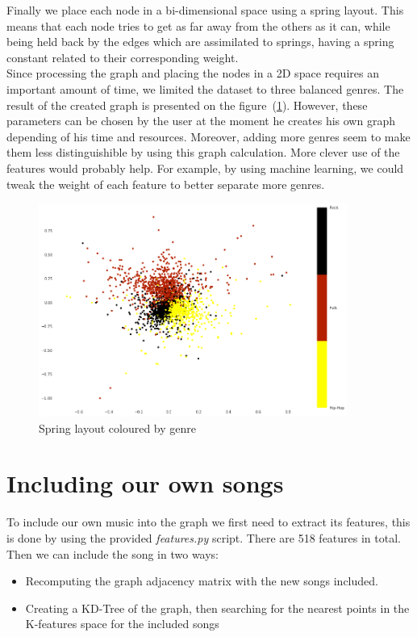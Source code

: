 \documentclass[11pt,a4paper,twoside]{article}
\begin{document}
Finally we place each node in a bi-dimensional space using a spring layout. This means that each node tries to get as far away from the others as it can, while being held back by the edges which are assimilated to springs, having a spring constant related to their corresponding weight.\\

Since processing the graph and placing the nodes in a 2D space requires an important amount of time, we limited the dataset to three balanced genres. The result of the created graph is presented on the figure~(\ref{fig:spring_layout}). However, these parameters can be chosen by the user at the moment he creates his own graph depending of his time and resources. Moreover, adding more genres seem to make them less distinguishible by using this graph calculation. More clever use of the features would probably help. For example, by using machine learning, we could tweak the weight of each feature to better separate more genres.

\begin{figure}[H]
\centering
\includegraphics[width=0.9\textwidth] {./Figures/graph_2}
\caption{Spring layout coloured by genre}
\label{fig:spring_layout}
\end{figure}
\section{Including our own songs}

To include our own music into the graph we first need to extract its features, this is done by using
the provided \textit{features.py} script\cite{fma_dataset}. There are 518 features in total.
Then we can include the song in two ways:
\begin{itemize}
\item Recomputing the graph adjacency matrix with the new songs included.

\item Creating a KD-Tree of the graph, then searching for the nearest points in the K-features space for the included songs
\end{itemize}
\end{document}
